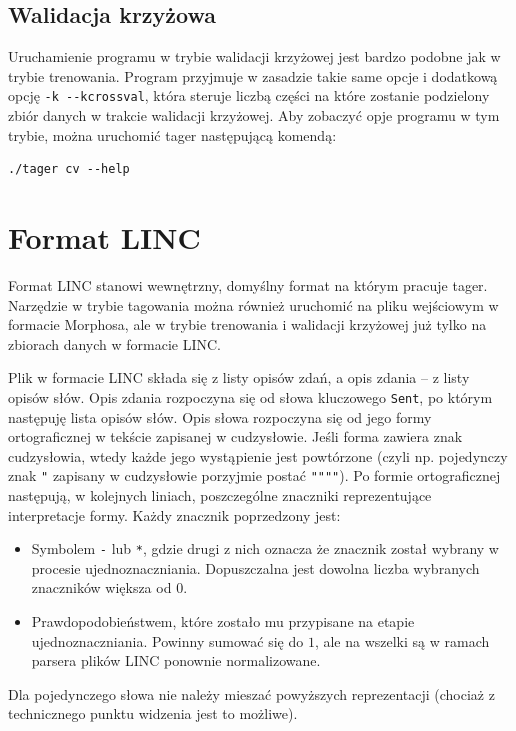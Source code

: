 \documentclass[a4paper,10]{article}
\begin{document}


\subsection{Walidacja krzyżowa}

Uruchamienie programu w trybie walidacji krzyżowej jest bardzo podobne
jak w trybie trenowania. Program przyjmuje w zasadzie takie same opcje
i dodatkową opcję \verb|-k --kcrossval|, która steruje liczbą części
na które zostanie podzielony zbiór danych w trakcie walidacji krzyżowej.
Aby zobaczyć opje programu w tym trybie, można uruchomić tager
następującą komendą:
\begin{verbatim}
./tager cv --help
\end{verbatim}

\section{Format LINC}\label{sec:linc_format}

Format LINC stanowi wewnętrzny, domyślny format na którym pracuje tager.
Narzędzie w trybie tagowania można również uruchomić na pliku wejściowym
w formacie Morphosa, ale w trybie trenowania i walidacji krzyżowej już
tylko na zbiorach danych w formacie LINC.

Plik w formacie LINC składa się z listy opisów zdań, a opis zdania --
z listy opisów słów. Opis zdania rozpoczyna się od słowa kluczowego
\verb|Sent|, po którym następuję lista opisów słów.
Opis słowa rozpoczyna się od jego formy ortograficznej w tekście
zapisanej w cudzysłowie. Jeśli forma zawiera znak cudzysłowia,
wtedy każde jego wystąpienie jest powtórzone (czyli np. pojedynczy
znak \verb|"| zapisany w cudzysłowie porzyjmie postać \verb|""""|).
Po formie ortograficznej następują, w kolejnych liniach, 
poszczególne znaczniki reprezentujące interpretacje formy. 
Każdy znacznik poprzedzony jest:
\begin{itemize}
\item Symbolem \verb|-| lub \verb|*|, gdzie drugi z nich oznacza
  że znacznik został wybrany w procesie ujednoznaczniania.
  Dopuszczalna jest dowolna liczba wybranych znaczników większa
  od $0$.
\item Prawdopodobieństwem, które zostało mu przypisane
  na etapie ujednoznaczniania. Powinny sumować się do $1$,
  ale na wszelki są w ramach parsera plików LINC ponownie
  normalizowane.
\end{itemize}
Dla pojedynczego słowa nie należy mieszać powyższych reprezentacji
(chociaż z technicznego punktu widzenia jest to możliwe).
\end{document}
